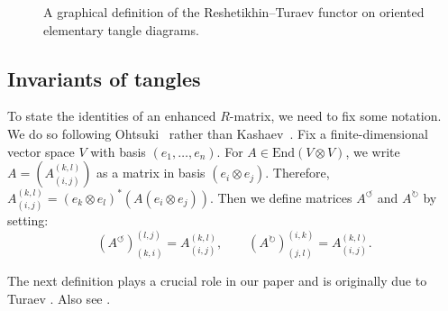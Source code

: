 \documentclass[pdftex]{sigma}
\makeatletter
\newif\ifv@ht@ \newif\ifv@dp@
\renewcommand*{\phantom} {\v@ht@true \v@dp@true \h@true \ph@nt}
\numberwithin{equation}{section}
\theoremstyle{definition}
\makeatother
\begin{document}
\begin{figure}[htpb!]
\qquad
{}
\qquad
{}
\caption{A graphical definition of the Reshetikhin--Turaev functor on oriented
 elementary tangle diagrams.}\label{fig:FIG3}
\end{figure}

\subsection{Invariants of tangles}
\label{sub:tangles}

To state the identities of an enhanced $R$-matrix, we need to fix some notation.
We do so following Ohtsuki~\cite{Ohtsuki} rather than Kashaev~\cite{GK:multi, Kas1}.
Fix a finite-dimensional vector space $V$ with basis $(e_1, \dots, e_n)$.
For $A \in \mathrm{End}(V \otimes V)$, we write $A = (A_{(i,j)}^{(k,l)})$ as a matrix in
basis $(e_i \otimes e_j)$. Therefore,
$A_{(i,j)}^{(k,l)} = (e_k \otimes e_l)^{\ast}(A(e_i \otimes e_j))$. Then we define
matrices $A^{\circlearrowleft}$ and $A^{\circlearrowright}$ by setting:
\begin{equation}
\label{Ab}
(A^\circlearrowleft)_{(k,i)}^{(l,j)} =A_{(i,j)}^{(k,l)}, \qquad
(A^\circlearrowright)_{(j,l)}^{(i,k)}=A_{(i,j)}^{(k,l)} .
\end{equation}

The next definition plays a crucial role in our paper {and is originally due to Turaev \cite{Turaev88,Turaev89}. Also see \cite[Section~XII.4]{Kassel}}.
\end{document}
